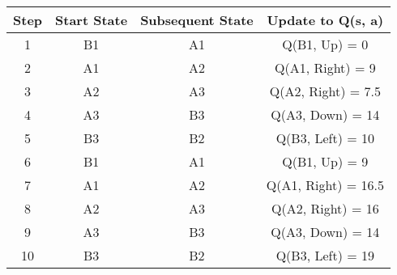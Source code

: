 \documentclass[12pt,letterpaper]{article}
\begin{document}
\begin{enumerate}
      \begin{tabular}{| c | c | c | c |}
      \hline
      Step & Start State & Subsequent State & Update to Q(s, a) \\
      \hline
      1  & B1 & A1 & Q(B1, Up) = 0 \\
      \hline
      2  & A1 & A2 & Q(A1, Right) = 9 \\
      \hline
      3  & A2 & A3 & Q(A2, Right) = 7.5 \\
      \hline
      4  & A3 & B3 & Q(A3, Down) = 14 \\
      \hline
      5  & B3 & B2 & Q(B3, Left) = 10 \\
      \hline
      6  & B1 & A1 & Q(B1, Up) = 9 \\
      \hline
      7  & A1 & A2 & Q(A1, Right) = 16.5 \\
      \hline
      8  & A2 & A3 & Q(A2, Right) = 16 \\
      \hline
      9  & A3 & B3 & Q(A3, Down) = 14 \\
      \hline
      10 & B3 & B2 & Q(B3, Left) = 19 \\
      \hline
      \end{tabular}
  \end{enumerate}
\end{document}
